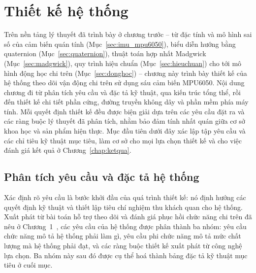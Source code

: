 \documentclass[../DoAn.tex]{subfiles}
\begin{document}
\chapter{Thiết kế hệ thống}
\label{chap:thietke}

Trên nền tảng lý thuyết đã trình bày ở chương trước -- từ đặc tính và mô hình sai
số của cảm biến quán tính (Mục~\ref{sec:imu_mpu6050}), biểu diễn hướng bằng
quaternion (Mục~\ref{sec:quaternion}), thuật toán hợp nhất Madgwick
(Mục~\ref{sec:madgwick}), quy trình hiệu chuẩn (Mục~\ref{sec:hieuchuan}) cho tới
mô hình động học chi trên (Mục~\ref{sec:donghoc}) -- chương này trình bày thiết
kế của hệ thống theo dõi vận động chi trên sử dụng sáu cảm biến MPU6050. Nội dung
chương đi từ phân tích yêu cầu và đặc tả kỹ thuật, qua kiến trúc tổng thể, rồi
đến thiết kế chi tiết phần cứng, đường truyền không dây và phần mềm phía máy tính. Mỗi quyết định thiết kế đều được biện giải dựa trên các yêu cầu
đặt ra và các ràng buộc lý thuyết đã phân tích, nhằm bảo đảm tính nhất quán giữa
cơ sở khoa học và sản phẩm hiện thực. Mục đầu tiên dưới đây xác lập tập yêu cầu và
các chỉ tiêu kỹ thuật mục tiêu, làm cơ sở cho mọi lựa chọn thiết kế và cho việc
đánh giá kết quả ở Chương~\ref{chap:ketqua}.

\section{Phân tích yêu cầu và đặc tả hệ thống}
\label{sec:yeucau}
Xác định rõ yêu cầu là bước khởi đầu của quá trình thiết kế: nó định hướng các
quyết định kỹ thuật và thiết lập tiêu chí nghiệm thu khách quan cho hệ thống.
Xuất phát từ bài toán hỗ trợ theo dõi và đánh giá phục hồi chức năng chi trên đã
nêu ở Chương~1~\cite{bonato2005, maciejasz2014}, các yêu cầu của hệ thống được
phân thành ba nhóm: yêu cầu chức năng mô tả hệ thống phải làm gì, yêu cầu phi
chức năng mô tả mức chất lượng mà hệ thống phải đạt, và các ràng buộc thiết kế
xuất phát từ công nghệ lựa chọn. Ba nhóm này sau đó được cụ thể hoá thành bảng
đặc tả kỹ thuật mục tiêu ở cuối mục.
\end{document}
